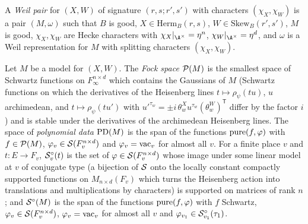 \begin{definition}
A \emph{Weil pair} for $(X,W)$ of signature $(r,s;r',s')$ with characters $(\chi_X,\chi_W)$ is a pair $(M,\omega)$ such
that $B$ is good, $X\in\mathrm{Herm}_B(r,s)$, $W\in\mathrm{Skew}_B(r',s')$, $M$ is good, $\chi_X,\chi_W$ are Hecke
characters with $\chi_X|_{\A^\times}=\eta^n$, $\chi_W|_{\A^\times}=\eta^d$, and $\omega$ is a Weil representation for $M$
with splitting characters $(\chi_X,\chi_W)$.
\end{definition}

\begin{definition}\label{pf:thmK:def:fock}
Let $M$ be a model for $(X,W)$. The \emph{Fock space} $\mathcal{P}(M)$ is the smallest space of Schwartz functions on
$F_\infty^{n\times d}$ which contains the Gaussians of $M$ (Schwartz functions on which the derivatives of the
Heisenberg lines $t\mapsto\rho_\psi(tu)$, $u$ archimedean, and $t\mapsto\rho_\psi(tu')$ with
$u'^{\tau_w}=\pm i\,\theta^X_wu^{\tau_w}(\theta^W_w)^{\mathsf T}$ differ by the factor $i$) and is stable under the
derivatives of the archimedean Heisenberg lines. The space of \emph{polynomial data} $\operatorname{PD}(M)$ is the span of the
functions $\operatorname{pure}(f,\varphi)$ with $f\in\mathcal{P}(M)$, $\varphi_v\in\mathcal{S}(F_v^{n\times d})$ and
$\varphi_v=\mathrm{vac}_v$ for almost all $v$. For a finite place $v$ and $t\colon E\to F_v$, $\mathcal{S}^{\circ}_v(t)$ is the set of
$\varphi\in\mathcal{S}(F_v^{n\times d})$ whose image under some linear model at $v$ of conjugate type (a bijection of
$\mathcal{S}$ onto the locally constant compactly supported functions on $M_{n\times d}(F_v)$ which turns the Heisenberg action
into translations and multiplications by characters) is supported on matrices of rank $n$; and $\mathcal{S}^{\circ}(M)$ is the span of
the functions $\operatorname{pure}(f,\varphi)$ with $f$ Schwartz, $\varphi_v\in\mathcal{S}(F_v^{n\times d})$, $\varphi_v=\mathrm{vac}_v$
for almost all $v$ and $\varphi_{v_1}\in\mathcal{S}^{\circ}_{v_1}(\tau_1)$.
\end{definition}

